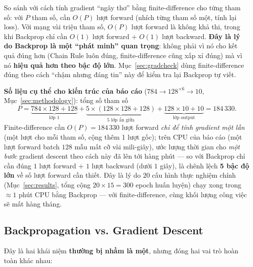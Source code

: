 \documentclass[12pt,a4paper]{article}
\begin{document}
So sánh với cách tính gradient ``ngây thơ'' bằng finite-difference cho từng
tham số: với $P$ tham số, cần $O(P)$ lượt forward (nhích từng tham số một,
tính lại loss). Với mạng vài triệu tham số, $O(P)$ lượt forward là không
khả thi, trong khi Backprop chỉ cần $O(1)$ lượt forward $+$ $O(1)$ lượt
backward. \textbf{Đây là lý do Backprop là một ``phát minh'' quan trọng}:
không phải vì nó cho kết quả đúng hơn (Chain Rule luôn đúng, finite-difference
cũng xấp xỉ đúng) mà vì nó \textbf{hiệu quả hơn theo bậc độ lớn}. Mục~\ref{sec:gradcheck}
dùng finite-difference đúng theo cách ``chậm nhưng đáng tin'' này để kiểm tra
lại Backprop tự viết.

\textbf{Số liệu cụ thể cho kiến trúc của báo cáo} ($784\to128^{\times6}\to10$,
Mục~\ref{sec:methodology}): tổng số tham số
$$P = \underbrace{784{\times}128{+}128}_{\text{lớp 1}} + \underbrace{5\times(128{\times}128{+}128)}_{\text{5 lớp ẩn giữa}} + \underbrace{128{\times}10{+}10}_{\text{lớp output}} = 184\,330.$$
Finite-difference cần $O(P)=184\,330$ lượt forward \emph{chỉ để tính
gradient một lần} (một lượt cho mỗi tham số, cộng thêm 1 lượt gốc); trên
CPU của báo cáo (một lượt forward batch $128$ mẫu mất cỡ vài mili-giây),
ước lượng thời gian cho \emph{một bước} gradient descent theo cách này đã
lên tới hàng phút --- so với Backprop chỉ cần đúng $1$ lượt forward $+$
$1$ lượt backward (dưới $1$ giây), là chênh lệch \textbf{5 bậc độ lớn} về
số lượt forward cần thiết. Đây là lý do $20$ cấu hình thực nghiệm chính
(Mục~\ref{sec:results}, tổng cộng $20\times15=300$ epoch huấn luyện) chạy
xong trong $\approx1$ phút CPU bằng Backprop --- với finite-difference,
cùng khối lượng công việc sẽ mất hàng tháng.

\subsection{Backpropagation vs. Gradient Descent}
\label{sec:bp_vs_gd}

Đây là hai khái niệm \textbf{thường bị nhầm là một}, nhưng đóng hai vai trò
hoàn toàn khác nhau:
\end{document}
